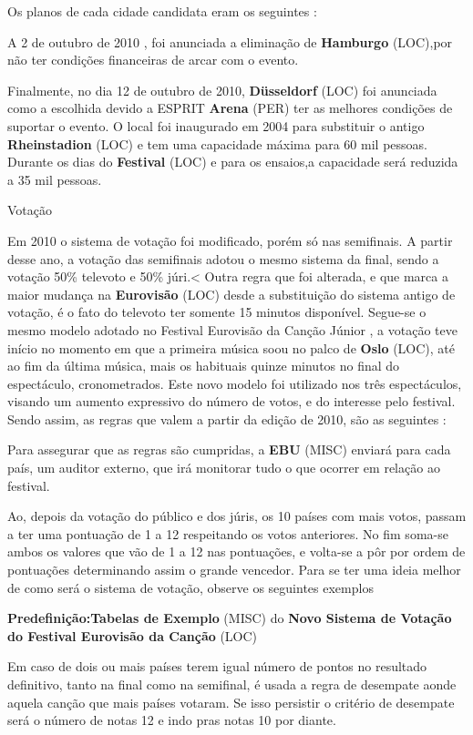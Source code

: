 \documentclass[12pt,a4paper]{article}
\begin{document}
Os planos de cada cidade candidata eram os seguintes :

A 2 de outubro de 2010 , foi anunciada a eliminação de \textbf{Hamburgo} (LOC),por não ter condições financeiras de arcar com o evento.

Finalmente, no dia 12 de outubro de 2010, \textbf{Düsseldorf} (LOC) foi anunciada como a escolhida devido a ESPRIT \textbf{Arena} (PER) ter as melhores condições de suportar o evento. O local foi inaugurado em 2004 para substituir o antigo \textbf{Rheinstadion} (LOC) e tem uma capacidade máxima para 60 mil pessoas. Durante os dias do \textbf{Festival} (LOC) e para os ensaios,a capacidade será reduzida a 35 mil pessoas.



Votação

Em 2010 o sistema de votação foi modificado, porém só nas semifinais. A partir desse ano, a votação das semifinais adotou o mesmo sistema da final, sendo a votação 50\% televoto e 50\% júri.< Outra regra que foi alterada, e que marca a maior mudança na \textbf{Eurovisão} (LOC) desde a substituição do sistema antigo de votação, é o fato do televoto ter somente 15 minutos disponível. Segue-se o mesmo modelo adotado no Festival Eurovisão da Canção Júnior , a votação teve início no momento em que a primeira música soou no palco de \textbf{Oslo} (LOC), até ao fim da última música, mais os habituais quinze minutos no final do espectáculo, cronometrados. Este novo modelo foi utilizado nos três espectáculos, visando um aumento expressivo do número de votos, e do interesse pelo festival. Sendo assim, as regras que valem a partir da edição de 2010, são as seguintes :

Para assegurar que as regras são cumpridas, a \textbf{EBU} (MISC) enviará para cada país, um auditor externo, que irá monitorar tudo o que ocorrer em relação ao festival.

Ao, depois da votação do público e dos júris, os 10 países com mais votos, passam a ter uma pontuação de 1 a 12 respeitando os votos anteriores. No fim soma-se ambos os valores que vão de 1 a 12 nas pontuações, e volta-se a pôr por ordem de pontuações determinando assim o grande vencedor. Para se ter uma ideia melhor de como será o sistema de votação, observe os seguintes exemplos

\textbf{Predefinição:Tabelas de Exemplo} (MISC) do \textbf{Novo Sistema de Votação do Festival Eurovisão da Canção} (LOC)

Em caso de dois ou mais países terem igual número de pontos no resultado definitivo, tanto na final como na semifinal, é usada a regra de desempate aonde aquela canção que mais países votaram. Se isso persistir o critério de desempate será o número de notas 12 e indo pras notas 10 por diante.
\end{document}
